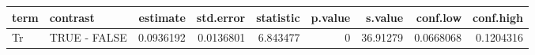 
\begin{tabular}{l|l|r|r|r|r|r|r|r}
\hline
term & contrast & estimate & std.error & statistic & p.value & s.value & conf.low & conf.high\\
\hline
Tr & TRUE - FALSE & 0.0936192 & 0.0136801 & 6.843477 & 0 & 36.91279 & 0.0668068 & 0.1204316\\
\hline
\end{tabular}
